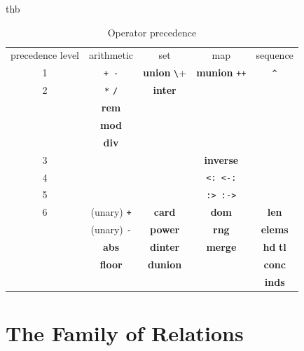\documentclass{overturerepchap}
\newcommand{\blankline}{\vspace{\baselineskip}}
\newcommand{\keyw}[1]{{\bf\ttfamily #1}}
\begin{document}
\blankline
\begin{table}{thb}
\begin{center}
  \begin{tabular}{ccccc}
    \hline
    precedence level & arithmetic       & set                   & map                    & sequence \\
    1                & {\tt + -}        & \keyw{union} \verb+\+ & \keyw{munion} {\tt ++} & \verb+^+ \\
    2                & \verb+*+ {\tt /} & \keyw{inter}          &                        & \\
                     & \keyw{rem}       &                       &                        & \\
                     & \keyw{mod}       &                       &                        & \\
                     & \keyw{div}       &                       &                        & \\
    3                &                  &                       & \keyw{inverse}         & \\
    4                &                  &                       & {\tt <: <-:}           & \\
    5                &                  &                       & {\tt :> :->}           & \\
    6                & (unary) {\tt +}  & \keyw{card}           & \keyw{dom}             & \keyw{len}         \\
                     & (unary) {\tt -}  & \keyw{power}          & \keyw{rng}             & \keyw{elems}       \\
                     & \keyw{abs}       & \keyw{dinter}         & \keyw{merge}           & \keyw{hd} \keyw{tl} \\
                     & \keyw{floor}     & \keyw{dunion}         &                        & \keyw{conc}        \\
                     &                  &                       &                        & \keyw{inds}        \\
    \hline
  \end{tabular}
\end{center}
\caption{Operator precedence}
\end{table}

\section{The Family of Relations}
\end{document}
